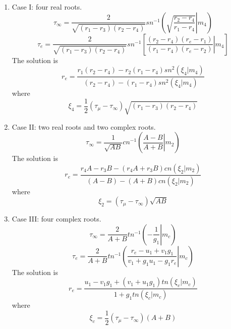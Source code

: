 \documentclass[12pt]{book}
\begin{document}
\begin{enumerate}
 \item Case I: four real roots.\\
\begin{equation}
\tau_\infty=\frac{2}{\sqrt{(r_1-r_3)(r_2-r_4)}}
sn^{-1}\left(\left.\sqrt{\frac{r_2-r_4}{r_1-r_4}}\right|m_4\right)
\end{equation}
\begin{equation}
\tau_e=\frac{2}{\sqrt{(r_1-r_3)(r_2-r_4)}}
sn^{-1}\left[\left.\frac{(r_2-r_4)(r_e-r_1)}{(r_1-r_4)(r_e-r_2)}\right|m_4\right]
\end{equation}
The solution is
\begin{equation}
r_e=\frac{r_1(r_2-r_4)-r_2(r_1-r_4)sn^2(\xi_4|m_4)}{(r_2-r_4)-(r_1-r_4)sn^2(\xi_4|m_4)}
\end{equation}
where
\begin{equation}
 \xi_4=\frac{1}{2}(\tau_\mu-\tau_\infty)\sqrt{(r_1-r_3)(r_2-r_4)}
\end{equation}
%
\item Case II: two real roots and two complex roots.\\
\begin{equation}
 \tau_{\infty}=\frac{1}{\sqrt{AB}}cn^{-1}\left(\left.\frac{A-B}{A+B}\right|m_2\right)
\end{equation}
The solution is 
\begin{equation}
 r_e=\frac{r_4A-r_3B-(r_4A+r_3B)cn(\xi_2|m_2)}{(A-B)-(A+B)cn(\xi_2|m_2)}
\end{equation}
where
\begin{equation}
 \xi_2=(\tau_\mu-\tau_\infty)\sqrt{AB}
\end{equation}
\item Case III: four complex roots.\\
\begin{equation}
 \tau_{\infty}=\frac{2}{A+B}tn^{-1}\left(\left.-\frac{1}{g_1}\right|m_c\right)
\end{equation}
\begin{equation}
 \tau_{e}=\frac{2}{A+B}tn^{-1}\left(\left.\frac{r_e-u_1+v_1g_1}{v_1+g_1u_1-g_1r_e}\right|m_c\right)
\end{equation}
The solution is 
\begin{equation}
 r_e=\frac{u_1-v_1g_1+(v_1+u_1g_1)tn(\xi_c|m_c)}{1+g_1tn(\xi_c|m_c)}
\end{equation}
where
\begin{equation}
 \xi_c=\frac{1}{2}(\tau_\mu-\tau_{\infty})(A+B)
\end{equation}
\end{enumerate}
\end{document}
